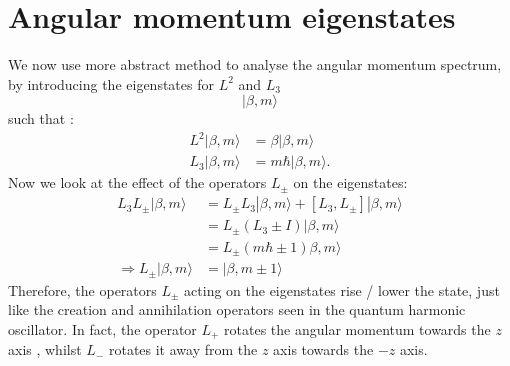 \section{Angular momentum eigenstates}
We now use more abstract method to analyse the angular momentum spectrum, by introducing the eigenstates for $L^2$ and $ L_3$
\begin{equation}
| \beta, m\rangle
\end{equation}
such that :
\begin{subequations}
	\begin{align}
	L^2 | \beta, m\rangle &= \beta  | \beta, m\rangle \\
	L_3 | \beta, m\rangle &= m \hbar | \beta, m\rangle.
	\end{align}
\end{subequations}
Now we look at the effect of the operators $L_\pm$ on the eigenstates:
\begin{align}
L_3 L_\pm | \beta, m\rangle &= L_\pm L_3 | \beta, m\rangle+ [ L_3,L_\pm]| \beta, m\rangle \nonumber\\
&=L_\pm ( L_3 \pm I) | \beta, m\rangle \nonumber \\
&= L_\pm (m \hbar \pm 1) \beta, m\rangle  \nonumber \\
\Rightarrow L_\pm | \beta, m\rangle &= | \beta , m\pm 1\rangle
\end{align}
Therefore, the operators $L_\pm$ acting on the eigenstates rise / lower the state, just like the creation and annihilation operators seen in the quantum harmonic oscillator. 
In fact, the operator $L_+$ rotates the angular momentum towards the $z$axis , whilst $L_-$ rotates it away from the $z$ axis towards the $-z$ axis.  
